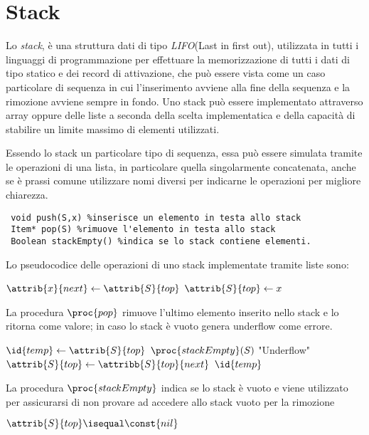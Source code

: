 \section{Stack}
Lo \emph{stack}, è una struttura dati di tipo \emph{LIFO}(Last in first out), utilizzata in tutti i linguaggi di programmazione per effettuare 
la memorizzazione di tutti i dati di tipo statico e dei record di attivazione, che può essere vista come un caso particolare di sequenza 
in cui l'inserimento avviene alla fine della sequenza e la rimozione avviene sempre in fondo.\newline
Uno stack può essere implementato attraverso array oppure delle liste a seconda della scelta implementatica e della capacità di stabilire un limite massimo di elementi utilizzati.

Essendo lo stack un particolare tipo di sequenza, essa può essere simulata tramite le operazioni di una lista, in particolare quella singolarmente concatenata,
anche se  è prassi comune utilizzare nomi diversi per indicarne le operazioni per migliore chiarezza.

\begin{verbatim}
 void push(S,x) %inserisce un elemento in testa allo stack 
 Item* pop(S) %rimuove l'elemento in testa allo stack  
 Boolean stackEmpty() %indica se lo stack contiene elementi.
\end{verbatim}
Lo pseudocodice delle operazioni di uno stack implementate tramite liste sono:
\begin{codebox}
\li $\attrib{x}{next} \gets \attrib{S}{top}$
\li $\attrib{S}{top} \gets x$
\end{codebox}

La procedura $\proc{pop}$ rimuove l'ultimo elemento inserito nello stack e lo ritorna
come valore; in caso lo stack è vuoto genera underflow come errore.
\begin{codebox}
\li $\id{temp} \gets \attrib{S}{top}$
\li \If $\proc{stackEmpty}(S)$
    \Then
\li        \Error "Underflow"
    \End
\li $\attrib{S}{top} \gets \attribb{S}{top}{next}$
\li \Return $\id{temp}$
\end{codebox}

La procedura $\proc{stackEmpty}$ indica se lo stack è vuoto e viene utilizzato per
assicurarsi di non provare ad accedere allo stack vuoto per la rimozione
\begin{codebox}
\li \Return $ \attrib{S}{top} \isequal \const{nil}$
\end{codebox}

